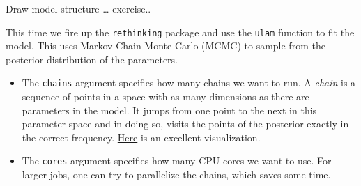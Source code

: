 \documentclass[
]{book}
\begin{document}
Draw model structure \ldots{} exercise..

This time we fire up the \texttt{rethinking} package and use the \texttt{ulam} function
to fit the model.
This uses Markov Chain Monte Carlo (MCMC) to sample from the posterior
distribution of the parameters.

\begin{itemize}
\item
  The \texttt{chains} argument specifies how many chains we want to run.
  A \emph{chain} is a sequence of points in a space with as many dimensions as there
  are parameters in the model. It jumps from one point to the next in this parameter
  space and in doing so, visits the points of the posterior exactly in the correct
  frequency. \href{https://blog.revolutionanalytics.com/2013/09/an-animated-peek-into-the-workings-of-bayesian-statistics.html}{Here}
  is an excellent visualization.
\item
  The \texttt{cores} argument specifies how many CPU cores we want to use.
  For larger jobs, one can try to parallelize
  the chains, which saves some time.
\end{itemize}
\end{document}
